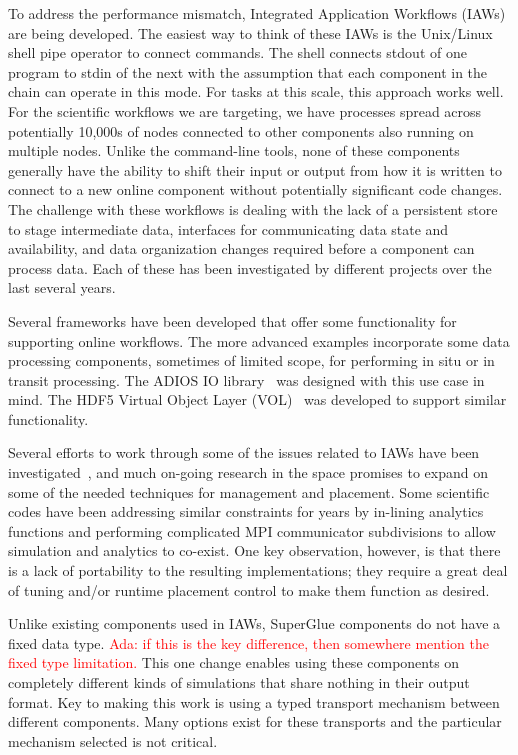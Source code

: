 \documentclass[conference]{IEEEtran}
\newcommand{\ada}[1]{\textcolor{red}{Ada: #1}}
\begin{document}

To address the performance mismatch, Integrated Application Workflows (IAWs)
are being developed. The easiest way to think of these IAWs is the Unix/Linux
shell pipe operator to connect commands. The shell connects stdout of one
program to stdin of the next with the assumption that each component in the
chain can operate in this mode. For tasks at this scale, this approach works
well. For the scientific workflows we are targeting, we have processes spread
across potentially 10,000s of nodes connected to other components also running
on multiple nodes. Unlike the command-line tools, none of these components
generally have the ability to shift their input or output from how it is
written to connect to a new online component without potentially significant
code changes. The challenge with these workflows is dealing with the lack of a
persistent store to stage intermediate data, interfaces for communicating data
state and availability, and data organization changes required before a
component can process data.  Each of these has been investigated by different
projects over the last several years.

Several frameworks have been developed that offer some functionality for
supporting online workflows. The more advanced examples incorporate some data
processing components, sometimes of limited scope, for performing in situ or in
transit processing. The ADIOS IO library~\cite{lofstead:2009:adaptable} was designed with
this use case in mind. The HDF5 Virtual Object Layer
(VOL)~\cite{chaarawi:2013:hdf5-vol} was developed to support similar
functionality.

Several efforts to work through some of the issues related to IAWs have been
investigated~\cite{karimabadi:2013:catalyst,whitlock:2011:libsim,Glean,dayal:2014:flexpath,dreher:2016:bredala,zheng:2010:predata},
and much on-going research in the space promises to expand on some of the
needed techniques for management and placement.  Some
scientific codes have been addressing similar constraints for years by
in-lining analytics functions and performing complicated MPI communicator
subdivisions to allow simulation and analytics to co-exist.  One key
observation, however, is that there is a lack of portability to the resulting
implementations; they require a great deal of tuning and/or runtime placement
control to make them function as desired.
\fi


Unlike existing components used in IAWs, SuperGlue
components do not have a fixed data type. \ada{if this is the key
  difference, then somewhere mention the fixed type limitation. }
 This one change enables using these
components on completely different kinds of simulations that share nothing in
their output format. Key to making this work is using a typed transport
mechanism between different components. Many options exist for these transports
and the particular mechanism selected is not critical. 
\end{document}
